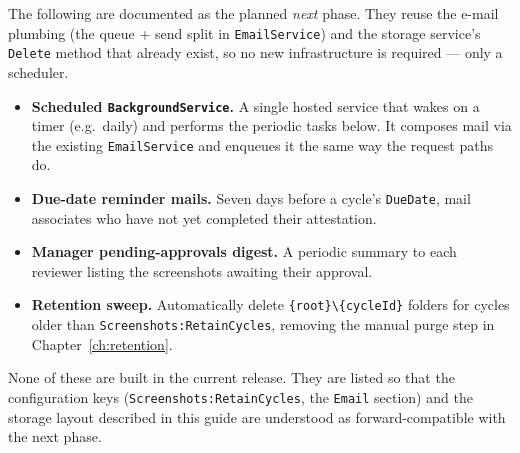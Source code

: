 \documentclass[12pt,a4paper]{report}
\begin{document}
The following are documented as the planned \emph{next} phase. They reuse the e-mail plumbing
(the queue + send split in \texttt{EmailService}) and the storage service's \texttt{Delete} method
that already exist, so no new infrastructure is required --- only a scheduler.

\begin{itemize}
  \item \textbf{Scheduled \texttt{BackgroundService}.} A single hosted service that wakes on a timer
        (e.g.\ daily) and performs the periodic tasks below. It composes mail via the existing
        \texttt{EmailService} and enqueues it the same way the request paths do.
  \item \textbf{Due-date reminder mails.} Seven days before a cycle's \texttt{DueDate}, mail
        associates who have not yet completed their attestation.
  \item \textbf{Manager pending-approvals digest.} A periodic summary to each reviewer listing the
        screenshots awaiting their approval.
  \item \textbf{Retention sweep.} Automatically delete \texttt{\{root\}\textbackslash\{cycleId\}}
        folders for cycles older than \texttt{Screenshots:RetainCycles}, removing the manual purge
        step in Chapter~\ref{ch:retention}.
\end{itemize}

\begin{notebox}
None of these are built in the current release. They are listed so that the configuration keys
(\texttt{Screenshots:RetainCycles}, the \texttt{Email} section) and the storage layout described in
this guide are understood as forward-compatible with the next phase.
\end{notebox}

\end{document}
